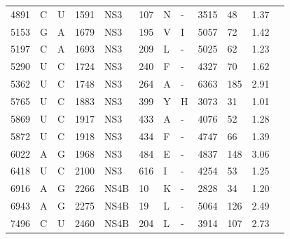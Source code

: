 \begin{longtabu}{X[l]X[l]X[l]X[l]X[l]X[l]X[l]X[l]X[l]X[l]X[l]X[l]}
 4891     & C    & U            & 1591              & NS3   & 107         & N                  & -                  & 3515           & 48               & 1.37   \\
 5153     & G    & A           & 1679              & NS3   & 195         & V                  & I                & 5057           & 72               & 1.42   \\
 5197     & C    & A            & 1693              & NS3   & 209         & L                  & -                  & 5025           & 62               & 1.23   \\
 5290     & U    & C            & 1724              & NS3   & 240         & F                  & -                  & 4327           & 70               & 1.62   \\
 5362     & U    & C            & 1748              & NS3   & 264         & A                  & -                  & 6363           & 185              & 2.91   \\
 5765     & U    & C            & 1883              & NS3   & 399         & Y                  & H                & 3073           & 31               & 1.01   \\
 5869     & U    & C            & 1917              & NS3   & 433         & A                  & -                  & 4076           & 52               & 1.28   \\
 5872     & U    & C            & 1918              & NS3   & 434         & F                  & -                  & 4747           & 66               & 1.39   \\
 6022     & A    & G            & 1968              & NS3   & 484         & E                  & -                  & 4837           & 148              & 3.06   \\
 6418     & U    & C            & 2100              & NS3   & 616         & I                  & -                  & 4254           & 53               & 1.25   \\
 6916     & A    & G            & 2266              & NS4B  & 10          & K                  & -                  & 2828           & 34               & 1.20   \\
 6943     & A    & G            & 2275              & NS4B  & 19          & L                  & -                  & 5064           & 126              & 2.49   \\
 7496     & C    & U            & 2460              & NS4B  & 204         & L                  & -                  & 3914           & 107              & 2.73   \\

\end{longtabu}

